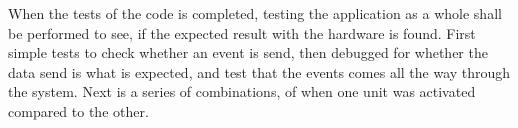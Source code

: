 When the tests of the code is completed, testing the application as a whole shall be performed to see, if the expected result with the hardware is found.
First simple tests to check whether an event is send, then debugged for whether the data send is what is expected, and test that the events comes all the way through the system.
Next is a series of combinations, of when one unit was activated compared to the other.






